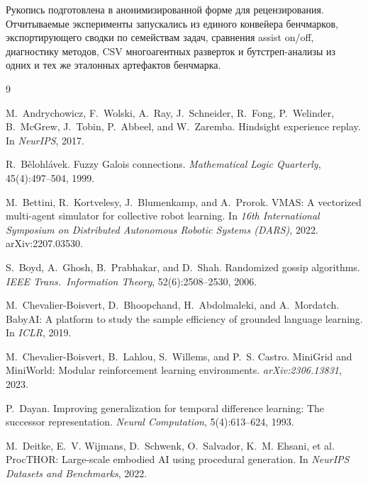 \documentclass{article}
\begin{document}
\begin{ack}
Рукопись подготовлена в анонимизированной форме для рецензирования.
Отчитываемые эксперименты запускались из единого конвейера бенчмарков,
экспортирующего сводки по семействам задач, сравнения assist on/off,
диагностику методов, CSV многоагентных разверток и бутстреп-анализы из
одних и тех же эталонных артефактов бенчмарка.
\end{ack}

{\small
\begin{thebibliography}{9}

M.~Andrychowicz, F.~Wolski, A.~Ray, J.~Schneider, R.~Fong, P.~Welinder, B.~McGrew, J.~Tobin, P.~Abbeel, and W.~Zaremba.
\newblock Hindsight experience replay.
\newblock In \emph{NeurIPS}, 2017.

R.~B\v{e}lohl\'avek.
\newblock Fuzzy Galois connections.
\newblock \emph{Mathematical Logic Quarterly}, 45(4):497--504, 1999.

M.~Bettini, R.~Kortvelesy, J.~Blumenkamp, and A.~Prorok.
\newblock VMAS: A vectorized multi-agent simulator for collective robot learning.
\newblock In \emph{16th International Symposium on Distributed Autonomous Robotic Systems (DARS)}, 2022.
\newblock arXiv:2207.03530.

S.~Boyd, A.~Ghosh, B.~Prabhakar, and D.~Shah.
\newblock Randomized gossip algorithms.
\newblock \emph{IEEE Trans.\ Information Theory}, 52(6):2508--2530, 2006.

M.~Chevalier-Boisvert, D.~Bhoopchand, H.~Abdolmaleki, and A.~Mordatch.
\newblock BabyAI: A platform to study the sample efficiency of grounded language learning.
\newblock In \emph{ICLR}, 2019.

M.~Chevalier-Boisvert, B.~Lahlou, S.~Willems, and P.~S. Castro.
\newblock MiniGrid and MiniWorld: Modular reinforcement learning environments.
\newblock \emph{arXiv:2306.13831}, 2023.

P.~Dayan.
\newblock Improving generalization for temporal difference learning: The successor representation.
\newblock \emph{Neural Computation}, 5(4):613--624, 1993.

M.~Deitke, E.~V. Wijmans, D.~Schwenk, O.~Salvador, K.~M. Ehsani, et al.
\newblock ProcTHOR: Large-scale embodied AI using procedural generation.
\newblock In \emph{NeurIPS Datasets and Benchmarks}, 2022.


\end{thebibliography}}
\end{document}
